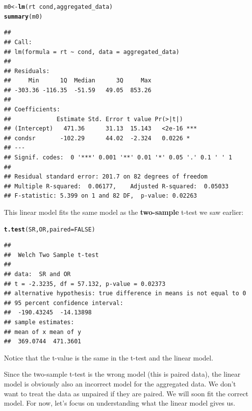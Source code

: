 \documentclass[12pt]{book}\usepackage[]{graphicx}\usepackage[]{color}
\makeatletter
\newcommand{\hlnum}[1]{\textcolor[rgb]{0.686,0.059,0.569}{#1}}%
\newcommand{\hlopt}[1]{\textcolor[rgb]{0,0,0}{#1}}%
\newcommand{\hlstd}[1]{\textcolor[rgb]{0.345,0.345,0.345}{#1}}%
\newcommand{\hlkwb}[1]{\textcolor[rgb]{0.69,0.353,0.396}{#1}}%
\newcommand{\hlkwc}[1]{\textcolor[rgb]{0.333,0.667,0.333}{#1}}%
\newcommand{\hlkwd}[1]{\textcolor[rgb]{0.737,0.353,0.396}{\textbf{#1}}}%
\newenvironment{kframe}{%
 \def\at@end@of@kframe{}%
 \ifinner\ifhmode%
  \def\at@end@of@kframe{\end{minipage}}%
  \begin{minipage}{\columnwidth}%
 \fi\fi%
 \def\FrameCommand##1{\hskip\@totalleftmargin \hskip-\fboxsep
 \colorbox{shadecolor}{##1}\hskip-\fboxsep
     \hskip-\linewidth \hskip-\@totalleftmargin \hskip\columnwidth}%
 \MakeFramed {\advance\hsize-\width
   \@totalleftmargin\z@ \linewidth\hsize
   \@setminipage}}%
 {\par\unskip\endMakeFramed%
 \at@end@of@kframe}
\newenvironment{knitrout}{}{} %
\makeatother
\begin{document}
\begin{knitrout}
\color{fgcolor}\begin{kframe}
\begin{alltt}
\hlstd{m0}\hlkwb{<-}\hlkwd{lm}\hlstd{(rt}\hlopt{~}\hlstd{cond,aggregated_data)}
\hlkwd{summary}\hlstd{(m0)}
\end{alltt}
\begin{verbatim}
## 
## Call:
## lm(formula = rt ~ cond, data = aggregated_data)
## 
## Residuals:
##     Min      1Q  Median      3Q     Max 
## -303.36 -116.35  -51.59   49.05  853.26 
## 
## Coefficients:
##             Estimate Std. Error t value Pr(>|t|)    
## (Intercept)   471.36      31.13  15.143   <2e-16 ***
## condsr       -102.29      44.02  -2.324   0.0226 *  
## ---
## Signif. codes:  0 '***' 0.001 '**' 0.01 '*' 0.05 '.' 0.1 ' ' 1
## 
## Residual standard error: 201.7 on 82 degrees of freedom
## Multiple R-squared:  0.06177,	Adjusted R-squared:  0.05033 
## F-statistic: 5.399 on 1 and 82 DF,  p-value: 0.02263
\end{verbatim}
\end{kframe}
\end{knitrout}

This linear model fits the same model as the  \textbf{two-sample} t-test we saw earlier:

\begin{knitrout}
\color{fgcolor}\begin{kframe}
\begin{alltt}
\hlkwd{t.test}\hlstd{(SR,OR,}\hlkwc{paired}\hlstd{=}\hlnum{FALSE}\hlstd{)}
\end{alltt}
\begin{verbatim}
## 
## 	Welch Two Sample t-test
## 
## data:  SR and OR
## t = -2.3235, df = 57.132, p-value = 0.02373
## alternative hypothesis: true difference in means is not equal to 0
## 95 percent confidence interval:
##  -190.43245  -14.13898
## sample estimates:
## mean of x mean of y 
##  369.0744  471.3601
\end{verbatim}
\end{kframe}
\end{knitrout}

Notice that the t-value is the same in the t-test and the linear model.

Since the two-sample t-test is the wrong model (this is paired data), the linear model is obviously also an incorrect model for the aggregated data. We don't want to treat the data as unpaired if they are paired. We will soon fit the correct model. For now, let's focus on understanding what the linear model gives us.
\end{document}
